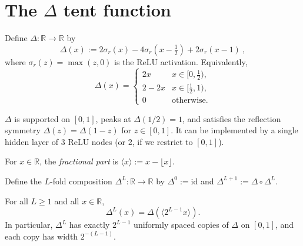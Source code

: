 \section{The \texorpdfstring{$\Delta$}{Delta} tent function}\label{sec:delta}

\begin{definition}\label{def:deltaTent}
Define $\Delta : \mathbb{R} \to \mathbb{R}$ by
\[
  \Delta(x) := 2\sigma_r(x) - 4\sigma_r(x - \tfrac{1}{2}) + 2\sigma_r(x - 1)
  \: ,
\]
where $\sigma_r(z) = \max(z,0)$ is the ReLU activation.
Equivalently,
\[
  \Delta(x) = \begin{cases}
    2x & x \in [0, \tfrac{1}{2}), \\
    2 - 2x & x \in [\tfrac{1}{2}, 1), \\
    0 & \text{otherwise.}
  \end{cases}
\]
\end{definition}

\begin{remark}
  $\Delta$ is supported on $[0,1]$, peaks at $\Delta(1/2) = 1$, and satisfies
  the reflection symmetry $\Delta(z) = \Delta(1-z)$ for $z \in [0,1]$.
  It can be implemented by a single hidden layer of 3 ReLU nodes (or 2, if we
  restrict to $[0,1]$).
\end{remark}

\begin{definition}\label{def:fractionalPart}
For $x \in \mathbb{R}$, the \emph{fractional part} is $\langle x \rangle := x - \lfloor x \rfloor$.
\end{definition}

\begin{definition}\label{def:deltaTentIter}
Define the $L$-fold composition $\Delta^L : \mathbb{R} \to \mathbb{R}$ by $\Delta^0 := \mathrm{id}$
and $\Delta^{L+1} := \Delta \circ \Delta^L$.
\end{definition}

\begin{proposition}[Proposition 5.1]\label{prop:deltaTentIter_eq}
For all $L \geq 1$ and all $x \in \mathbb{R}$,
\[
  \Delta^L(x) = \Delta\!\left(\langle 2^{L-1} x \rangle\right).
\]
In particular, $\Delta^L$ has exactly $2^{L-1}$ uniformly spaced copies of $\Delta$ on $[0,1]$,
and each copy has width $2^{-(L-1)}$.
\end{proposition}

